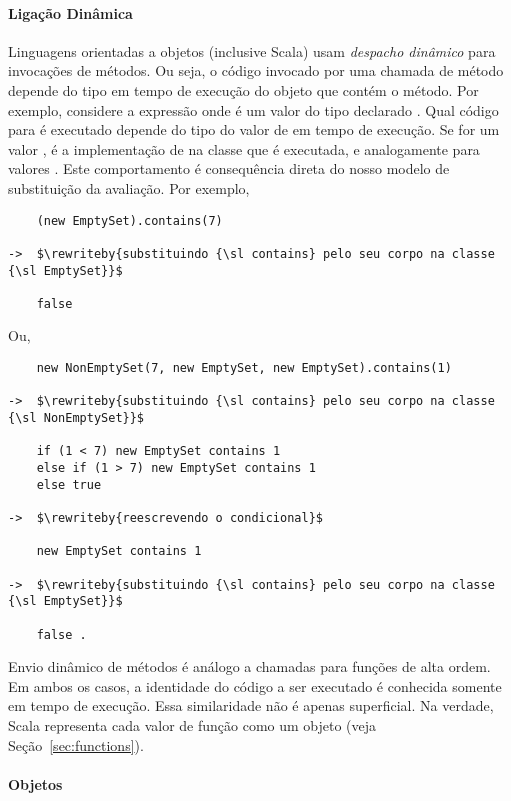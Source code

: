 \paragraph{Liga\c{c}\~{a}o Din\^{a}mica}
Linguagens orientadas a objetos (inclusive Scala) usam \emph{despacho din\^{a}mico} para 
invoca\c{c}\~{o}es de m\'{e}todos. Ou seja, o c\'{o}digo invocado por uma chamada de m\'{e}todo depende
do tipo em tempo de execu\c{c}\~{a}o do objeto que cont\'{e}m o m\'{e}todo. Por exemplo, considere
a express\~{a}o  onde  \'{e} um valor do tipo declarado . 
Qual c\'{o}digo para  \'{e} executado depende do tipo do valor de  em 
tempo de execu\c{c}\~{a}o. Se for um valor , \'{e} a implementa\c{c}\~{a}o de  na 
classe  que \'{e} executada, e analogamente para valores .
Este comportamento \'{e} consequ\^{e}ncia direta do nosso modelo de substitui\c{c}\~{a}o da avalia\c{c}\~{a}o.
Por exemplo, 
\begin{lstlisting}
    (new EmptySet).contains(7) 

->  $\rewriteby{substituindo {\sl contains} pelo seu corpo na classe {\sl EmptySet}}$

    false
\end{lstlisting}
Ou,
\begin{lstlisting}
    new NonEmptySet(7, new EmptySet, new EmptySet).contains(1)

->  $\rewriteby{substituindo {\sl contains} pelo seu corpo na classe {\sl NonEmptySet}}$

    if (1 < 7) new EmptySet contains 1
    else if (1 > 7) new EmptySet contains 1
    else true

->  $\rewriteby{reescrevendo o condicional}$

    new EmptySet contains 1

->  $\rewriteby{substituindo {\sl contains} pelo seu corpo na classe {\sl EmptySet}}$

    false .
\end{lstlisting}

Envio din\^{a}mico de m\'{e}todos \'{e} an\'{a}logo a chamadas para fun\c{c}\~{o}es de alta ordem. 
Em ambos os casos, a identidade do c\'{o}digo  a ser executado \'{e} conhecida somente
em tempo de execu\c{c}\~{a}o. Essa similaridade n\~{a}o \'{e} apenas superficial. Na verdade, 
Scala representa cada valor de fun\c{c}\~{a}o como um objeto (veja Se\c{c}\~{a}o~\ref{sec:functions}).

\paragraph{Objetos}

